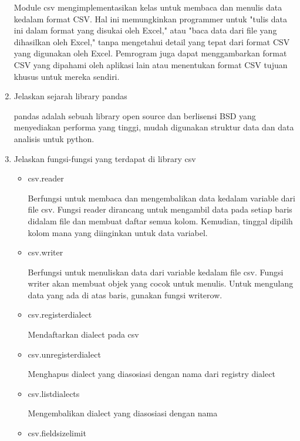 \begin{enumerate}
Module csv mengimplementasikan kelas untuk membaca dan menulis data kedalam format CSV. Hal ini memungkinkan programmer untuk "tulis data ini dalam format yang disukai oleh Excel," atau "baca data dari file yang dihasilkan oleh Excel," tanpa mengetahui detail yang tepat dari format CSV yang digunakan oleh Excel. Pemrogram juga dapat menggambarkan format CSV yang dipahami oleh aplikasi lain atau menentukan format CSV tujuan khusus untuk mereka sendiri.

\item Jelaskan sejarah library pandas

pandas adalah sebuah library open source dan berlisensi BSD yang menyediakan performa yang tinggi, mudah digunakan struktur data dan data analisis untuk python.

\item Jelaskan fungsi-fungsi yang terdapat di library csv
\begin{itemize}
	\item csv.reader
	
	Berfungsi untuk membaca dan mengembalikan data kedalam variable dari file csv.
	Fungsi reader dirancang untuk mengambil data pada setiap baris didalam file dan membuat daftar semua kolom. Kemudian, tinggal dipilih kolom mana yang diinginkan untuk data variabel.
	
	
	\item csv.writer
	
	Berfungsi untuk menuliskan data dari variable kedalam file csv.
	Fungsi writer akan membuat objek yang cocok untuk menulis. Untuk mengulang data yang ada di atas baris, gunakan fungsi writerow.
	
	
	\item csv.register\textunderscore dialect
	
	Mendaftarkan dialect pada csv
	\item csv.unregister\textunderscore dialect
	
	Menghapus dialect yang diasosiasi dengan nama dari registry dialect
	
	\item csv.list\textunderscore dialects
	
	Mengembalikan dialect yang diasosiasi dengan nama
	
	\item csv.field\textunderscore size\textunderscore limit
	

\end{itemize}
\end{enumerate}
